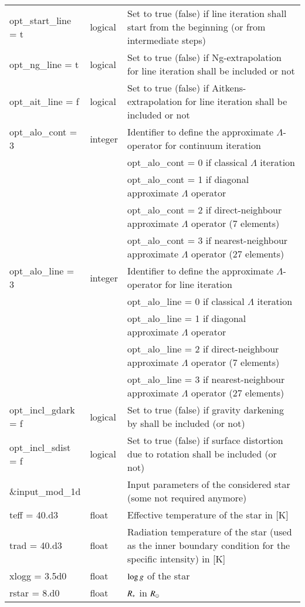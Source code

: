 \documentclass[10pt,a4paper]{article}
\begin{document}
\begin{footnotesize}
\begin{longtable}[h]{p{0.24\linewidth}p{0.07\linewidth}p{0.69\linewidth}}
opt\_start\_line = t & logical & Set to true (false) if line iteration shall start from the beginning (or from intermediate steps) \\
opt\_ng\_line = t & logical  & Set to true (false) if Ng-extrapolation for line iteration shall be included or not \\
opt\_ait\_line = f & logical & Set to true (false) if Aitkens-extrapolation for line iteration shall be included or not \\
opt\_alo\_cont = 3 & integer & Identifier to define the approximate $\Lambda$-operator for continuum iteration \\
 & & opt\_alo\_cont = 0 if classical $\Lambda$ iteration \\
 & & opt\_alo\_cont = 1 if diagonal approximate $\Lambda$ operator \\
 & & opt\_alo\_cont = 2 if direct-neighbour approximate $\Lambda$ operator (7 elements) \\
 & & opt\_alo\_cont = 3 if nearest-neighbour approximate $\Lambda$ operator (27 elements) \\
opt\_alo\_line = 3 & integer & Identifier to define the approximate $\Lambda$-operator for line iteration \\
 & & opt\_alo\_line = 0 if classical $\Lambda$ iteration \\
 & & opt\_alo\_line = 1 if diagonal approximate $\Lambda$ operator \\
 & & opt\_alo\_line = 2 if direct-neighbour approximate $\Lambda$ operator (7 elements) \\
 & & opt\_alo\_line = 3 if nearest-neighbour approximate $\Lambda$ operator (27 elements) \\
opt\_incl\_gdark = f & logical & Set to true (false) if gravity darkening by \cite{Zeipel24} shall be included (or not) \\
opt\_incl\_sdist = f & logical & Set to true (false) if surface distortion due to rotation shall be included (or not) \\\hline
%
\&input\_mod\_1d & & Input parameters of the considered star (some not required anymore) \\
%
teff = 40.d3 & float & Effective temperature of the star in [K] \\
trad = 40.d3 & float & Radiation temperature of the star (used as the inner boundary condition for the specific intensity) in [K] \\
xlogg = 3.5d0 & float & $\log g$ of the star \\
rstar = 8.d0 & float & $R_{\ast}$ in $R_{\odot}$ \\

\end{longtable}
\end{footnotesize}
\end{document}
